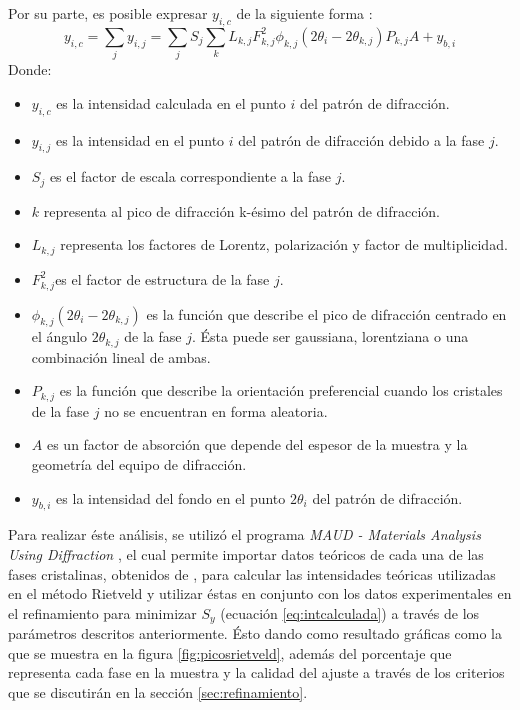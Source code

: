 \documentclass[../main.tex]{subfiles}
\begin{document}
Por su parte, es posible expresar $y_{i,c}$ de la siguiente forma \cite{Rietveld}:
\begin{equation}
    y_{i,c}=\sum_j y_{i,j}=\sum_{j}S_j\sum_{k}L_{k,j}F^2_{k,j}\phi_{k,j}\left(2\theta_i-2\theta_{k,j}\right)P_{k,j}A+y_{b,i}
    \label{eq:intcalculada}
\end{equation}
Donde:
\begin{itemize}
    \item $y_{i,c}$ es la intensidad calculada en el punto $i$ del patrón de difracción.
    \item $y_{i,j}$ es la intensidad en el punto $i$ del patrón de difracción debido a la fase $j$.
    \item $S_j$ es el factor de escala correspondiente a la fase $j$.
    \item $k$ representa al pico de difracción k-ésimo del patrón de difracción.
    \item $L_{k,j}$ representa los factores de Lorentz, polarización y factor de multiplicidad.
    \item $F^2_{k,j}$es el factor de estructura de la fase $j$.
    \item $\phi_{k,j}(2\theta_i-2\theta_{k,j})$ es la función que describe el pico de difracción centrado en el ángulo $2\theta_{k,j}$ de la fase $j$. Ésta puede ser gaussiana, lorentziana o una combinación lineal de ambas.
    \item $P_{k,j}$ es la función que describe la orientación preferencial cuando los cristales de la fase $j$ no se encuentran en forma aleatoria.
    \item $A$ es un factor de absorción que depende del espesor de la muestra y la geometría del equipo de difracción.
    \item $y_{b,i}$ es la intensidad del fondo en el punto $2\theta_i$ del patrón de difracción.
\end{itemize} 
Para realizar éste análisis, se utilizó el programa \textit{MAUD - Materials Analysis Using Diffraction} \cite{MAUD}, el cual permite importar datos teóricos de cada una de las fases cristalinas, obtenidos de \cite{COD}, para calcular las intensidades teóricas utilizadas en el método Rietveld y utilizar éstas en conjunto con los datos experimentales en el refinamiento para minimizar $S_y$ (ecuación \ref{eq:intcalculada}) a través de los parámetros descritos anteriormente. Ésto dando como resultado gráficas como la que se muestra en la figura \ref{fig:picosrietveld}, además del porcentaje que representa cada fase en la muestra y la calidad del ajuste a través de los criterios que se discutirán en la sección \ref{sec:refinamiento}.
\end{document}
